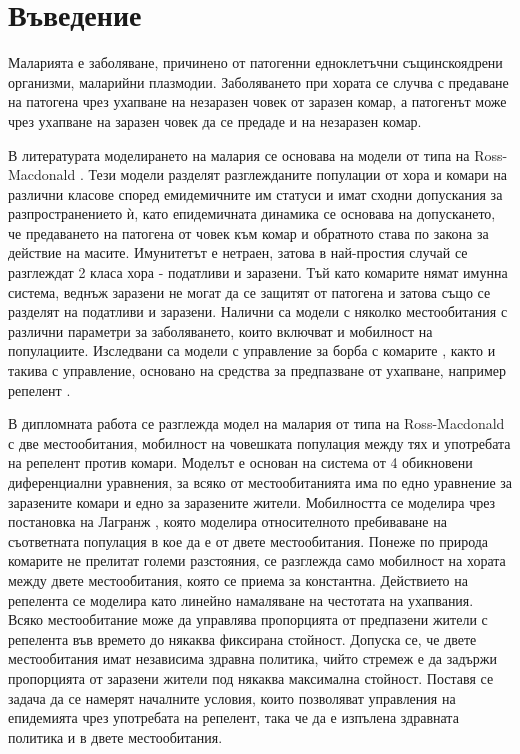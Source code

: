 \section{Въведение}
Маларията е заболяване, причинено от патогенни едноклетъчни същинскоядрени организми, маларийни плазмодии.
Заболяването при хората се случва с предаване на патогена чрез ухапване на незаразен човек от заразен комар, а патогенът може чрез ухапване на заразен човек да се предаде и на незаразен комар.

В литературата моделирането на малария се основава на модели от типа на Ross-Macdonald \cite{Smith2012}.
Тези модели разделят разглежданите популации от хора и комари на различни класове според емидемичните им статуси и имат сходни допускания за разпространението ѝ, като епидемичната динамика се основава на допускането, че предаването на патогена от човек към комар и обратното става по закона за действие на масите.
Имунитетът е нетраен, затова в най-простия случай се разглеждат 2 класа хора - податливи и заразени.
Тъй като комарите нямат имунна система, веднъж заразени не могат да се защитят от патогена и затова също се разделят на податливи и заразени.
Налични са модели \cite{Cosner2009, Ruktanonchai2016, Bichara2016} с няколко местообитания с различни параметри за заболяването, които включват и мобилност на популациите.
Изследвани са модели с управление за борба с комарите \cite{DeLara2016}, както и такива с управление, основано на средства за предпазване от ухапване, например репелент \cite{Rashkov2022, Rashkov2021}.

В дипломната работа се разглежда модел на малария от типа на Ross-Macdonald с две местообитания, мобилност на човешката популация между тях и употребата на репелент против комари.
Моделът е основан на система от 4 обикновени диференциални уравнения, за всяко от местообитанията има по едно уравнение за заразените комари и едно за заразените жители.
Мобилността се моделира чрез постановка на Лагранж \cite{Cosner2009}, която моделира относителното пребиваване на съответната популация в кое да е от двете местообитания.
Понеже по природа комарите не прелитат големи разстояния, се разглежда само мобилност на хората между двете местообитания, която се приема за константна.
Действието на репелента се моделира като линейно намаляване на честотата на ухапвания.
Всяко местообитание може да управлява пропорцията от предпазени жители с репелента във времето до някаква фиксирана стойност.
Допуска се, че двете местообитания имат независима здравна политика, чийто стремеж е да задържи пропорцията от заразени жители под някаква максимална стойност.
Поставя се задача да се намерят началните условия, които позволяват управления на епидемията чрез употребата на репелент, така че да е изпълена здравната политика и в двете местообитания.
